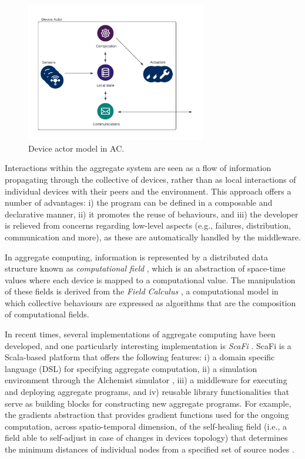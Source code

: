 \documentclass[12pt,a4paper,openright,twoside]{book}
\begin{document}
\begin{figure}[t]
    \centering
    \includegraphics[width=0.7\textwidth]{figures/deviceactor.pdf}
    \caption{Device actor model in AC.}
    \label{fig:device-actor}
\end{figure}

Interactions within the aggregate system are seen as a flow of information propagating through the 
    collective of devices, rather than as local interactions of individual devices with their
    peers and the environment. This approach offers a number of advantages:
    i) the program can be defined in a composable and declarative manner, 
    ii) it promotes the reuse of behaviours, and 
    iii) the developer is relieved from concerns regarding low-level aspects (e.g., failures, distribution, communication and more), 
    as these are automatically handled by the middleware.

In aggregate computing, information is represented by a distributed data structure known as 
    \emph{computational field} \cite{VIROLI2019100486, 1316820},
    which is an abstraction of space-time values where each device is mapped to a computational value.
    The manipulation of these fields is derived from the \emph{Field Calculus} \cite{viroli2016higher}, a computational model in which collective 
    behaviours are expressed as algorithms that are the composition of computational fields.

In recent times, several implementations of aggregate computing have been developed, and one particularly interesting 
    implementation is \emph{ScaFi} \cite{CASADEI2022101248}. ScaFi is a Scala-based platform that offers the following features: 
    i) a domain specific language (DSL) for specifying aggregate computation, 
    ii) a simulation environment through the Alchemist simulator \cite{alchemist}, 
    iii) a middleware for executing and deploying aggregate programs, and 
    iv) reusable library functionalities that serve as building blocks for constructing new aggregate programs. 
    For example, the gradients abstraction that provides gradient functions \cite{viroli2018engineering, beal2008fast} used for the ongoing computation, 
    across spatio-temporal dimension, of the self-healing field (i.e., a field able to self-adjust in case of changes 
    in devices topology) that determines the minimum distances of individual nodes from a specified set of source 
    nodes \cite{CASADEI2022101248}.
\end{document}
